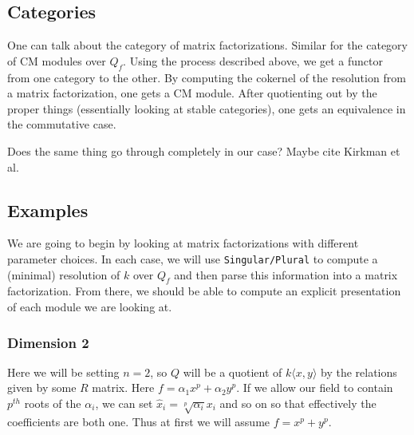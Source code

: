 \documentclass[12pt]{article}
\begin{document}
\subsection{Categories}
One can talk about the category of matrix factorizations. Similar for the category of CM modules over $Q_f$. Using the process described above, we get a functor from one category to the other. By computing the cokernel of the resolution from a matrix factorization, one gets a CM module. After quotienting out by the proper things (essentially looking at stable categories), one gets an equivalence in the commutative case.

{\color{red} Does the same thing go through completely in our case? Maybe cite Kirkman et al.}

\subsection{Examples}
We are going to begin by looking at matrix factorizations with different parameter choices. In each case, we will use \texttt{Singular/Plural} to compute a (minimal) resolution of $k$ over $Q_f$ and then parse this information into a matrix factorization. From there, we should be able to compute an explicit presentation of each module we are looking at.

\subsubsection{Dimension 2}
Here we will be setting $n=2$, so $Q$ will be a quotient of $k\langle x,y\rangle$ by the relations given by some $R$ matrix. Here $f=\alpha_1x^p+\alpha_2y^p.$ If we allow our field to contain $p^{th}$ roots of the $\alpha_i$, we can set $\hat x_i=\sqrt[p]{\alpha_i}x_i$ and so on so that effectively the coefficients are both one. Thus at first we will assume $f=x^p+y^p.$
\end{document}

